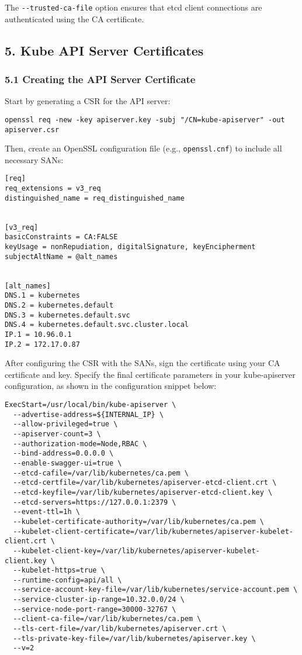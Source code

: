 \documentclass[11pt]{article}
\begin{document}
The \texttt{-{}-{}trusted-ca-file} option ensures that etcd client connections are authenticated using the CA certificate.
\subsection{5. Kube API Server Certificates}
\label{sec:orgccc2937}

\subsubsection{5.1 Creating the API Server Certificate}
\label{sec:org566c269}
Start by generating a CSR for the API server:

\begin{verbatim}
openssl req -new -key apiserver.key -subj "/CN=kube-apiserver" -out apiserver.csr
\end{verbatim}

Then, create an OpenSSL configuration file (e.g., \texttt{openssl.cnf}) to include all necessary SANs:

\begin{verbatim}
[req]
req_extensions = v3_req
distinguished_name = req_distinguished_name


[v3_req]
basicConstraints = CA:FALSE
keyUsage = nonRepudiation, digitalSignature, keyEncipherment
subjectAltName = @alt_names


[alt_names]
DNS.1 = kubernetes
DNS.2 = kubernetes.default
DNS.3 = kubernetes.default.svc
DNS.4 = kubernetes.default.svc.cluster.local
IP.1 = 10.96.0.1
IP.2 = 172.17.0.87
\end{verbatim}

After configuring the CSR with the SANs, sign the certificate using your CA certificate and key. Specify the final certificate parameters in your kube-apiserver configuration, as shown in the configuration snippet below:

\begin{verbatim}
ExecStart=/usr/local/bin/kube-apiserver \
  --advertise-address=${INTERNAL_IP} \
  --allow-privileged=true \
  --apiserver-count=3 \
  --authorization-mode=Node,RBAC \
  --bind-address=0.0.0.0 \
  --enable-swagger-ui=true \
  --etcd-cafile=/var/lib/kubernetes/ca.pem \
  --etcd-certfile=/var/lib/kubernetes/apiserver-etcd-client.crt \
  --etcd-keyfile=/var/lib/kubernetes/apiserver-etcd-client.key \
  --etcd-servers=https://127.0.0.1:2379 \
  --event-ttl=1h \
  --kubelet-certificate-authority=/var/lib/kubernetes/ca.pem \
  --kubelet-client-certificate=/var/lib/kubernetes/apiserver-kubelet-client.crt \
  --kubelet-client-key=/var/lib/kubernetes/apiserver-kubelet-client.key \
  --kubelet-https=true \
  --runtime-config=api/all \
  --service-account-key-file=/var/lib/kubernetes/service-account.pem \
  --service-cluster-ip-range=10.32.0.0/24 \
  --service-node-port-range=30000-32767 \
  --client-ca-file=/var/lib/kubernetes/ca.pem \
  --tls-cert-file=/var/lib/kubernetes/apiserver.crt \
  --tls-private-key-file=/var/lib/kubernetes/apiserver.key \
  --v=2
\end{verbatim}
\end{document}
